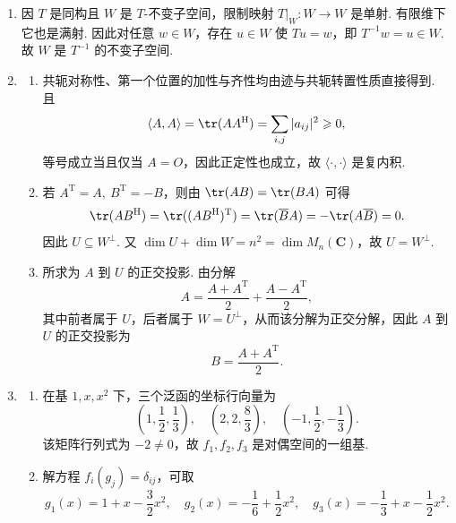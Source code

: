 \begin{enumerate}
    单射：若 $T|_{V_i}$ 为零映射对 $i=1,2,\cdots,n$ 都成立，则对任意 $v\in V$，$v=v_1+\cdots+v_n$，其中 $v_i\in V_i$，因此 $Tv=T|_{V_1}v_1+\cdots+T|_{V_n}v_n=\vec{0}_W$. 故 $T$ 是零映射，即 $\Phi$ 的核只有零元. 故 $\Phi$ 是单射.

    满射：由于 $V=V_1\oplus\cdots\oplus V_n$，任意 $v\in V$ 唯一写成 $v=v_1+\cdots+v_n$. 给定 $S_i\in\mathcal{L}(V_i,W)$，令
    \[
        T(v_1+\cdots+v_n)=S_1v_1+\cdots+S_nv_n
    \]
    即得 $\Phi(T)=(S_1,\ldots,S_n)$. 故 $\Phi$ 是满射，从而 $\Phi$ 是同构. 得证.

    \item 因 $T$ 是同构且 $W$ 是 $T$-不变子空间，限制映射 $T|_W:W\to W$ 是单射. 有限维下它也是满射. 因此对任意 $w\in W$，存在 $u\in W$ 使 $Tu=w$，即 $T^{-1}w=u\in W$. 故 $W$ 是 $T^{-1}$ 的不变子空间.

    \item
    \begin{enumerate}
        \item 共轭对称性、第一个位置的加性与齐性均由迹与共轭转置性质直接得到. 且
        \[
            \langle A,A\rangle=\tr(AA^{\mathrm{H}})=\sum_{i,j}|a_{ij}|^2\geqslant 0,
        \]
        等号成立当且仅当 $A=O$，因此正定性也成立，故 $\langle \cdot,\cdot\rangle$ 是复内积.

        \item 若 $A^{\mathrm{T}}=A,\ B^{\mathrm{T}}=-B$，则由 $\tr(AB)=\tr(BA)$ 可得
        \[
            \tr(AB^{\mathrm{H}})=\tr((AB^{\mathrm{H}})^{\mathrm{T}})
            =\tr(\overline{B}A)=-\tr(A\overline{B})=0.
        \]
        因此 $U\subseteq W^\perp$. 又 $\dim U+\dim W=n^2=\dim M_n(\mathbf{C})$，故 $U=W^\perp$.

        \item 所求为 $A$ 到 $U$ 的正交投影. 由分解
        \[
            A=\frac{A+A^{\mathrm{T}}}{2}+\frac{A-A^{\mathrm{T}}}{2},
        \]
        其中前者属于 $U$，后者属于 $W=U^\perp$，从而该分解为正交分解，因此 $A$ 到 $U$ 的正交投影为
        \[
            B=\frac{A+A^{\mathrm{T}}}{2}.
        \]
    \end{enumerate}

    \item
    \begin{enumerate}
        \item 在基 $1,x,x^2$ 下，三个泛函的坐标行向量为
        \[
            \left(1,\frac12,\frac13\right),\quad
            \left(2,2,\frac83\right),\quad
            \left(-1,\frac12,-\frac13\right).
        \]
        该矩阵行列式为 $-2\neq 0$，故 $f_1,f_2,f_3$ 是对偶空间的一组基.

        \item 解方程 $f_i(g_j)=\delta_{ij}$，可取
        \[
            g_1(x)=1+x-\frac32x^2, \quad
            g_2(x)=-\frac16+\frac12x^2, \quad
            g_3(x)=-\frac13+x-\frac12x^2.
        \]
    \end{enumerate}
\end{enumerate}

\clearpage
